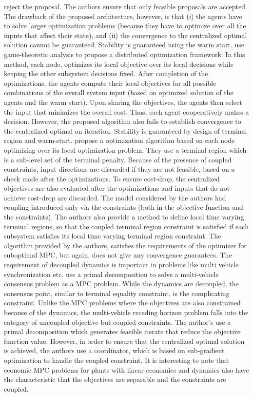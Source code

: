 \documentclass[10pt]{article}
\theoremstyle{definition}
\begin{document}
reject the proposal. The authors ensure that only feasible proposals
are accepted. The drawback of the proposed architecture, however, is
that (i) the agents have to solve larger optimization problems
(because they have to optimize over all the inputs that affect their
state), and (ii) the convergence to the centralized optimal solution
cannot be guaranteed. Stability is guaranteed using the warm
start. \citet{maestre:pena:camacho:2011} use game-theoretic analysis
to propose a distributed optimization framework. In this method, each
node, optimizes its local objective over its local decisions while
keeping the other subsystem decisions fixed. After completion of the
optimizations, the agents compute their local objectives for all
possible combinations of the overall system input (based on optimized
solution of the agents and the warm start). Upon sharing the
objectives, the agents then select the input that minimizes the
overall cost. Thus, each agent cooperatively makes a decision. However,
the proposed algorithm also fails to establish convergence to the
centralized optimal on iteration. Stability is guaranteed by design of
terminal region and warm-start. \citet{muller:revle:allgower:2012}
propose a optimization algorithm based on each node optimizing over
its local optimization problem. They use a terminal region which is a
sub-level set of the terminal penalty. Because of the presence of
coupled constraints, input directions are discarded if they are not
feasible, based on a check made after the optimizations. To ensure
cost-drop, the centralized objectives are also evaluated after the
optimizations and inputs that do not achieve cost-drop are
discarded. The model considered by the authors had coupling introduced
only via the constraints (both in the objective function and the
constraints). The authors also provide a method to define local time
varying terminal regions, so that the coupled terminal region
constraint is satisfied if each subsystem satisfies its local time
varying terminal region constraint. The algorithm provided by the
authors, satisfies the requirements of the optimizer for suboptimal
MPC, but again, does not give any convergence guarantees. The
requirement of decoupled dynamics is important in problems like multi
vehicle synchronization
etc. \citet{johansson:speranzon:johansson:johansson:2006} use a primal
decomposition to solve a multi-vehicle consensus problem as a MPC
problem. While the dynamics are decoupled, the consensus point,
similar to terminal equality constraint, is the complicating
constraint. Unlike the MPC problems where the objectives are also
constrained because of the dynamics, the multi-vehicle receding
horizon problem falls into the category of uncoupled objective but
coupled constraints. The author's use a primal decomposition which
generates feasible iterate that reduce the objective function
value. However, in order to ensure that the centralized optimal
solution is achieved, the authors use a coordinator, which is based on
sub-gradient optimization to handle the coupled constraint. It is
interesting to note that economic MPC problems for plants with linear
economics and dynamics also have the characteristic that the
objectives are separable and the constraints are coupled.
\end{document}
